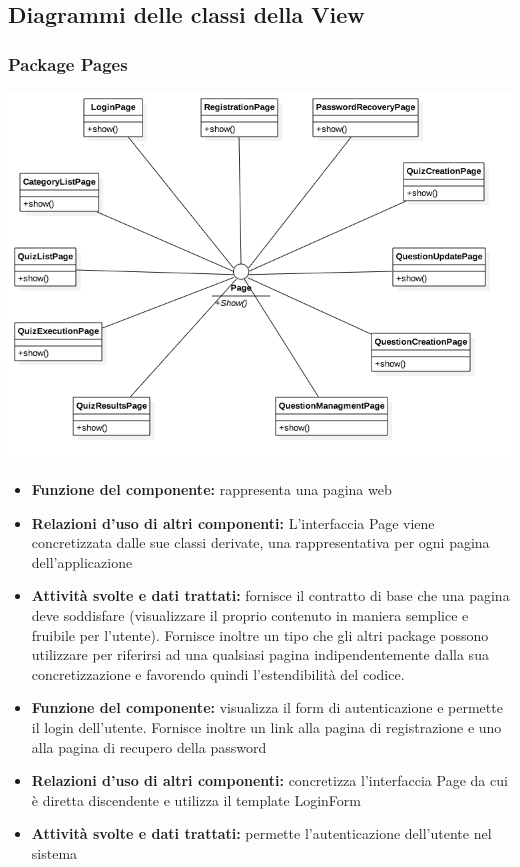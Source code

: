 \subsection{Diagrammi delle classi della View}	
		
	\subsubsection{Package Pages}
		\begin{center}
			\centerline{\includegraphics[scale=0.6]{../images/Pages.png}}
		\end{center}
			\begin{itemize}
		    		\item\textbf{Funzione del componente:} rappresenta una pagina web
				\item\textbf{Relazioni d'uso di altri componenti:} L'interfaccia Page viene concretizzata dalle sue classi derivate, una rappresentativa per ogni pagina dell'applicazione
				\item\textbf{Attività svolte e dati trattati:} fornisce il contratto di base che una pagina deve soddisfare (visualizzare il proprio contenuto in maniera semplice e fruibile per l'utente). Fornisce inoltre un tipo che gli altri package possono utilizzare per riferirsi ad una qualsiasi pagina indipendentemente dalla sua concretizzazione e favorendo quindi l'estendibilità del codice.
			\end{itemize}
			\begin{itemize}
		    		\item\textbf{Funzione del componente:} visualizza il form di autenticazione e permette il login dell'utente. Fornisce inoltre un link alla pagina di registrazione e uno alla pagina di recupero della password 
				\item\textbf{Relazioni d'uso di altri componenti:} concretizza l'interfaccia Page da cui è diretta discendente e utilizza il template LoginForm
				\item\textbf{Attività svolte e dati trattati:} permette l'autenticazione dell'utente nel sistema
			\end{itemize}
